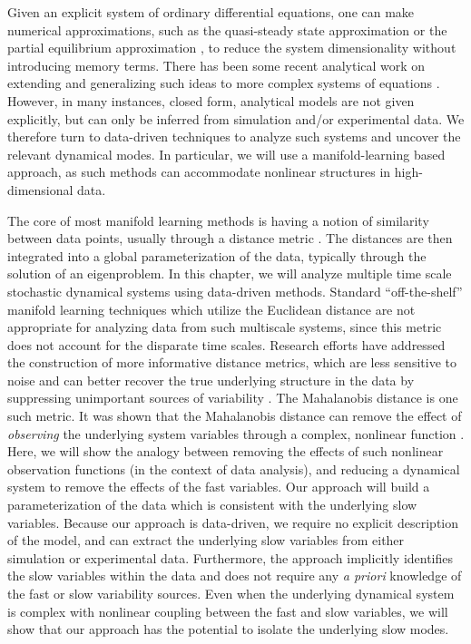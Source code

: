 Given an explicit system of ordinary differential equations,
one can make numerical approximations, such as the quasi-steady state approximation \cite{segel1989quasi} or
the partial equilibrium approximation \cite{gallagher1986combined}, to reduce the system dimensionality without introducing memory terms.
%
There has been some recent analytical work on extending and
generalizing such ideas to more complex systems of equations \cite{ait2008closed, calderon2007fitting, contou2011model, dong2007simplification, givon2004extracting, pavliotis2007parameter,  sotiropoulos2009model}.
%
However, in many instances, closed form, analytical models are not given explicitly,
but can only be inferred from simulation and/or experimental data.
%
We therefore turn to data-driven techniques to analyze such systems and uncover the relevant dynamical modes.
%
In particular, we will use a manifold-learning based approach, as such methods can accommodate nonlinear structures in high-dimensional data.

The core of most manifold learning methods is having a notion of similarity between data points,
usually through a distance metric \cite{Belkin2003, Coifman2006, coifman2005geometric, roweis2000nonlinear, tenenbaum2000global}.
%
The distances are then integrated into a global parameterization of the data, typically through the solution of an eigenproblem.
%
In this chapter, we will analyze multiple time scale stochastic dynamical systems using data-driven methods.
%
Standard ``off-the-shelf'' manifold learning techniques which utilize the Euclidean distance are not appropriate
for analyzing data from such multiscale systems, since this metric does not account for the disparate time scales.
%
Research efforts have addressed the construction of more informative distance metrics, which are less sensitive to noise
and can better recover the true underlying structure in the data by suppressing unimportant sources of variability \cite{berry2013time, gepshtein2013image, rubner2000earth, simonyan2013fisher, xing2002distance}.
%
The Mahalanobis distance is one such metric.
%
It was shown that the Mahalanobis distance can remove the effect of {\em observing}
the underlying system variables through a complex, nonlinear function \cite{dsilva2013nonlinear, singer2008non, talmon2013empirical}.
%
Here, we will show the analogy between removing the effects of such nonlinear observation functions (in the context of data analysis), and reducing a dynamical system to remove the effects of the fast variables.
%
Our approach will build a parameterization of the data which is consistent with the underlying slow variables.
%
Because our approach is data-driven, we require no explicit description of the model, and can extract the underlying slow variables
from either simulation or experimental data.
%
Furthermore, the approach implicitly identifies the slow variables within the data and
does not require any {\em a priori} knowledge of the fast or slow variability sources.
%
Even when the underlying dynamical system is complex with nonlinear coupling between the fast and slow variables, we will show that our approach has the potential to isolate the underlying slow modes.

